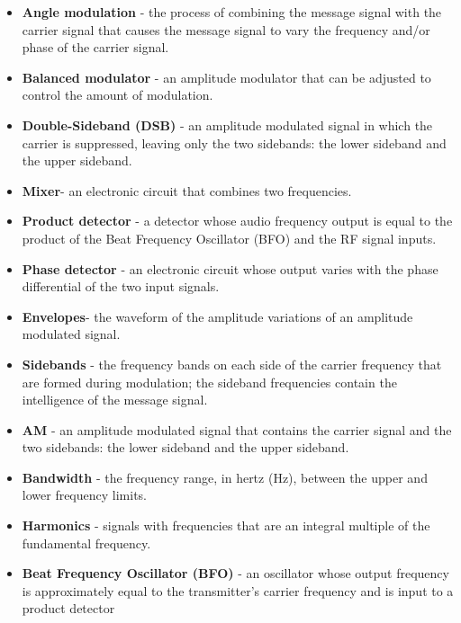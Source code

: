 \begin{itemize}
\item \textbf{Angle modulation} - the process of combining the message signal with the carrier signal that causes the message signal to vary the frequency and/or phase of the
carrier signal.
\item \textbf{Balanced modulator} - an amplitude modulator that can be adjusted to control the
amount of modulation.
\item \textbf{Double-Sideband (DSB)} - an amplitude modulated signal in which the carrier is
suppressed, leaving only the two sidebands: the lower sideband and the upper
sideband.
\item \textbf{Mixer}- an electronic circuit that combines two frequencies.
\item \textbf{Product detector} - a detector whose audio frequency output is equal to the product of the
Beat
Frequency Oscillator (BFO) and the RF signal inputs.
\item \textbf{Phase detector} - an electronic circuit whose output varies with the phase differential
of the two input signals.
\item \textbf{Envelopes}- the waveform of the amplitude variations of an amplitude modulated
signal. 
\item \textbf{Sidebands} - the frequency bands on each side of the carrier frequency that
are formed during modulation; the sideband frequencies contain the intelligence of
the message signal.
\item \textbf{AM} - an amplitude modulated signal that contains the carrier signal and the two
sidebands: the lower sideband and the upper sideband.
\item \textbf{Bandwidth} - the frequency range, in hertz (Hz), between the upper and lower
frequency limits. 
\item \textbf{Harmonics} - signals with frequencies that are an integral multiple of
the fundamental frequency. 
\item \textbf{Beat Frequency Oscillator (BFO)} - an oscillator whose
output frequency is approximately equal to the transmitter's carrier frequency and is
input to a product detector
\end {itemize}
